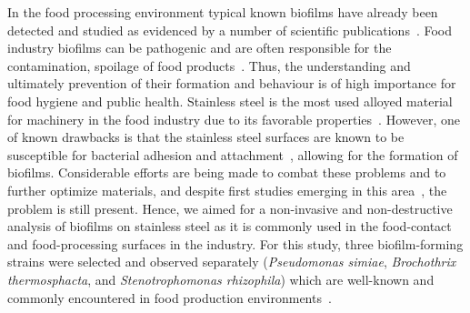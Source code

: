 \documentclass[foods,article,submit,moreauthors,pdftex]{Definitions/mdpi}
\begin{document}
In the food processing environment typical known biofilms have already been detected and studied as evidenced by a number of scientific publications~\cite{KUMAR19989,maes_evaluation_2017,WAGNER2020108668,10.3389/fmicb.2018.00898}. Food industry biofilms can be pathogenic and are often responsible for the contamination, spoilage of food products~\cite{GIAOURIS2018309,https://doi.org/10.1111/j.1365-2621.2008.01839.x,10.3389/fmicb.2018.00898}. Thus, the understanding and ultimately prevention of their formation and behaviour is of high importance for food hygiene and public health. Stainless steel is the most used alloyed material for machinery in the food industry due to its favorable properties~\cite{HONG2005213}. However, one of known drawbacks is that the stainless steel surfaces are known to be susceptible for bacterial adhesion and attachment~\cite{myszka_bacterial_2011,foods10010103}, allowing for the formation of biofilms. Considerable efforts are being made to combat these problems and to further optimize materials, and despite first studies emerging in this area~\cite{ban_nanoengineered_2020}, the problem is still present. Hence, we aimed for a non-invasive and non-destructive analysis of biofilms on stainless steel as it is commonly used in the food-contact and food-processing surfaces in the industry. For this study, three biofilm-forming strains were selected and observed separately (\textit{Pseudomonas simiae}, \textit{Brochothrix thermosphacta}, and \textit{Stenotrophomonas rhizophila}) which are well-known and commonly encountered in food production environments~\cite{10.3389/fmicb.2018.00898,https://doi.org/10.1111/1541-4337.12283}.
\end{document}
